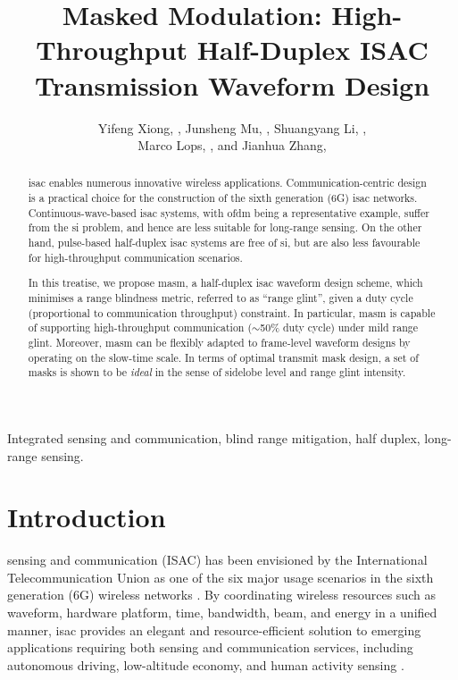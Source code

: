 \documentclass[journal,a4paper,10pt, romanappendices]{IEEEtran}
\title{Masked Modulation: High-Throughput Half-Duplex ISAC Transmission Waveform Design}
\author{Yifeng Xiong, \IEEEmembership{Member, IEEE}, Junsheng Mu, \IEEEmembership{Member, IEEE}, Shuangyang Li, \IEEEmembership{Member, IEEE}, \\Marco Lops, \IEEEmembership{Fellow, IEEE}, and Jianhua Zhang, \IEEEmembership{Senior Member, IEEE}




}
\begin{document}
\maketitle

\begin{abstract}
\Ac{isac} enables numerous innovative wireless applications. Communication-centric design is a practical choice for the construction of the sixth generation (6G) \ac{isac} networks. Continuous-wave-based \ac{isac} systems, with \ac{ofdm} being a representative example, suffer from the \ac{si} problem, and hence are less suitable for long-range sensing. On the other hand, pulse-based half-duplex \ac{isac} systems are free of \ac{si}, but are also less favourable for high-throughput communication scenarios. 

In this treatise, we propose \ac{masm}, a half-duplex \ac{isac} waveform design scheme, which minimises a range blindness metric, referred to as ``range glint'', given a duty cycle (proportional to communication throughput) constraint. In particular, \ac{masm} is capable of supporting high-throughput communication ($\sim$50\% duty cycle) under mild range glint. Moreover, \ac{masm} can be flexibly adapted to frame-level waveform designs by operating on the slow-time scale. In terms of optimal transmit mask design, a set of masks is shown to be \emph{ideal} in the sense of sidelobe level and range glint intensity. 
\end{abstract}

\begin{IEEEkeywords}
Integrated sensing and communication, blind range mitigation, half duplex, long-range sensing.
\end{IEEEkeywords}

\section{Introduction}
 sensing and communication (ISAC) has been envisioned by the International Telecommunication Union as one of the six major usage scenarios in the sixth generation (6G) wireless networks \cite{ITU2023}. By coordinating wireless resources such as waveform, hardware platform, time, bandwidth, beam, and energy in a unified manner, \ac{isac} provides an elegant and resource-efficient solution to emerging applications requiring both sensing and communication services, including autonomous driving, low-altitude economy, and human activity sensing \cite{Chafii2023CST,saad2019vision,yuanhaoNW,has_isac}. 
\end{document}
